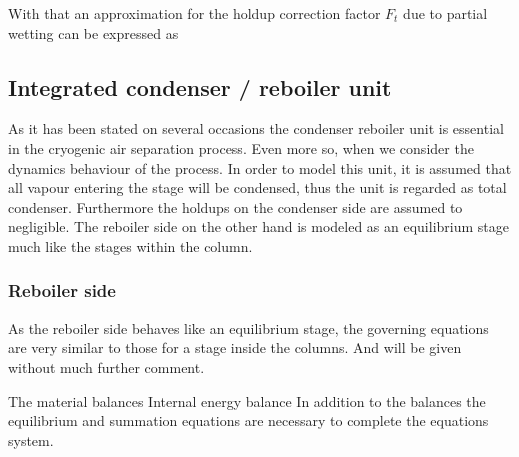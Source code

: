         With that an approximation for the holdup correction factor $F_t$ due to partial wetting can be expressed as

\subsection{Integrated condenser / reboiler unit}

    As it has been stated on several occasions the condenser reboiler unit is essential in the cryogenic air separation process.
    Even more so, when we consider the dynamics behaviour of the process. In order to model this unit, it is assumed that
    all vapour entering the stage will be condensed, thus the unit is regarded as total condenser. Furthermore the holdups on the
    condenser side are assumed to negligible. The reboiler side on the other hand is modeled as an equilibrium stage much like
    the stages within the column.

    \subsubsection{Reboiler side}
        As the reboiler side behaves like an equilibrium stage, the governing equations are very similar to those for
        a stage inside the columns. And will be given without much further comment.
    
        The material balances
        Internal energy balance
        In addition to the balances the equilibrium and summation equations are necessary to complete 
        the equations system.
        
